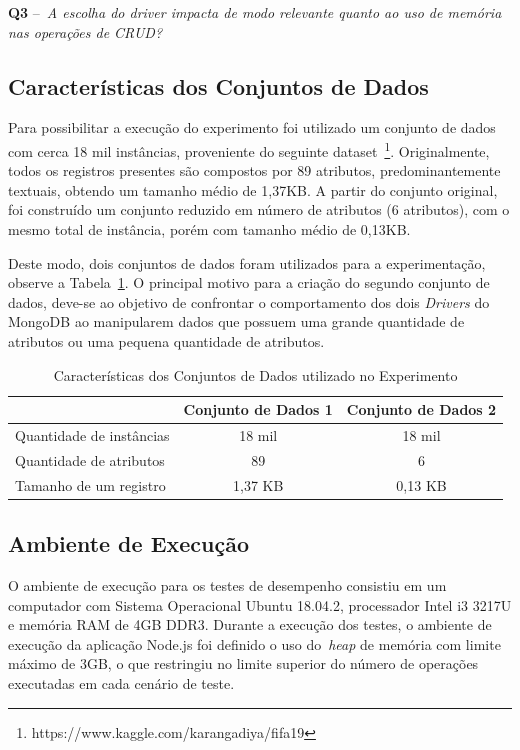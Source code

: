 \documentclass[12pt]{article}
\begin{document}
\textbf{Q3} --~\emph{A escolha do driver impacta de modo relevante quanto ao uso de memória nas operações de CRUD?}

\subsection{Características dos Conjuntos de Dados}

Para possibilitar a execução do experimento foi utilizado um conjunto de dados com cerca 18 mil instâncias, proveniente do seguinte dataset~\footnote{https://www.kaggle.com/karangadiya/fifa19}. Originalmente, todos os registros presentes são compostos por 89 atributos, predominantemente textuais, obtendo um tamanho médio de 1,37KB. A partir do conjunto original, foi construído um conjunto reduzido em número de atributos (6 atributos), com o mesmo total de instância, porém com tamanho médio de 0,13KB. 

Deste modo, dois conjuntos de dados foram utilizados para a experimentação, observe a Tabela~\ref{tab:conjunto-dados}. O principal motivo para a criação do segundo conjunto de dados, deve-se ao objetivo de confrontar o comportamento dos dois \emph{Drivers} do MongoDB ao manipularem dados que possuem uma grande quantidade de atributos ou uma pequena quantidade de atributos.

\begin{table}[ht]
\centering
\caption{Características dos Conjuntos de Dados utilizado no Experimento}
\label{tab:conjunto-dados}
\begin{tabular}{c|c|c|}
\cline{2-3}
                         & \textbf{Conjunto de Dados 1} & \textbf{Conjunto de Dados 2} \\ \hline
\multicolumn{1}{|l|}{Quantidade de instâncias} & 18 mil   		 			& 18 mil            \\ \hline
\multicolumn{1}{|l|}{Quantidade de atributos}  & 89        		 			& 6                  \\ \hline
\multicolumn{1}{|l|}{Tamanho de um registro}   & 1,37 KB        				& 0,13 KB                    \\ \hline
\end{tabular}
\end{table}

\subsection{Ambiente de Execução}

O ambiente de execução para os testes de desempenho consistiu em um computador com Sistema Operacional Ubuntu 18.04.2, processador Intel i3 3217U e memória RAM de 4GB DDR3. Durante a execução dos testes, o ambiente de execução da aplicação Node.js foi definido o uso do~\emph{heap} de memória com limite máximo de 3GB, o que restringiu no limite superior do número de operações executadas em cada cenário de teste.
\end{document}
